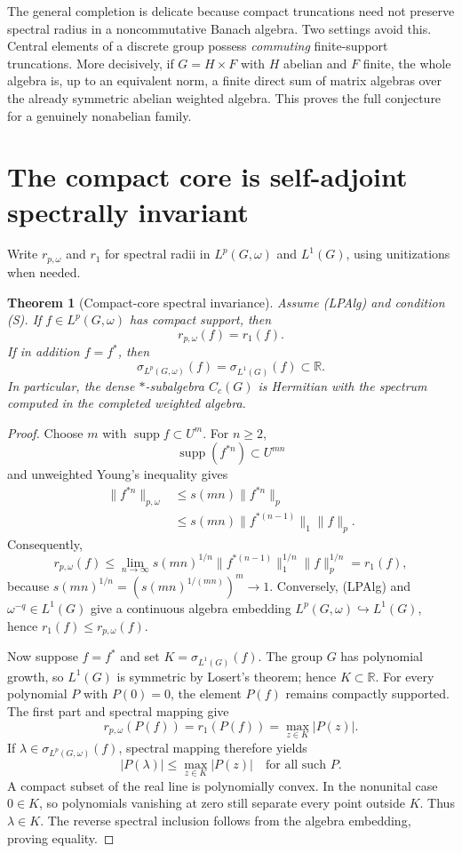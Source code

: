 \documentclass[11pt]{article}
\newtheorem{theorem}{Theorem}
\newcommand{\supp}{\operatorname{supp}}
\newcommand{\spec}{\sigma}
\begin{document}
The general completion is delicate because compact truncations need not
preserve spectral radius in a noncommutative Banach algebra.  Two settings
avoid this.  Central elements of a discrete group possess \emph{commuting}
finite-support truncations.  More decisively, if $G=H\times F$ with $H$
abelian and $F$ finite, the whole algebra is, up to an equivalent norm, a
finite direct sum of matrix algebras over the already symmetric abelian
weighted algebra.  This proves the full conjecture for a genuinely
nonabelian family.

\section{The compact core is self-adjoint spectrally invariant}

Write $r_{p,\omega}$ and $r_1$ for spectral radii in $L^p(G,\omega)$ and
$L^1(G)$, using unitizations when needed.

\begin{theorem}[Compact-core spectral invariance]\label{thm:core}
Assume (LPAlg) and condition (S).  If $f\in L^p(G,\omega)$ has compact
support, then
\[
 r_{p,\omega}(f)=r_1(f).
\]
If in addition $f=f^*$, then
\[
 \spec_{L^p(G,\omega)}(f)=\spec_{L^1(G)}(f)\subset\mathbb R.
\]
In particular, the dense $*$-subalgebra $C_c(G)$ is Hermitian with the
spectrum computed in the completed weighted algebra.
\end{theorem}

\begin{proof}
Choose $m$ with $\supp f\subset U^m$.  For $n\geq2$,
\[
 \supp(f^{*n})\subset U^{mn}
\]
and unweighted Young's inequality gives
\begin{align*}
 \|f^{*n}\|_{p,\omega}
 &\leq s(mn)\|f^{*n}\|_p\\
 &\leq s(mn)\|f^{*(n-1)}\|_1\|f\|_p.
\end{align*}
Consequently,
\[
 r_{p,\omega}(f)
 \leq \lim_{n\to\infty}s(mn)^{1/n}
       \|f^{*(n-1)}\|_1^{1/n}\|f\|_p^{1/n}
 =r_1(f),
\]
because $s(mn)^{1/n}=(s(mn)^{1/(mn)})^m\to1$.  Conversely, (LPAlg) and
$\omega^{-q}\in L^1(G)$ give a continuous algebra embedding
$L^p(G,\omega)\hookrightarrow L^1(G)$, hence $r_1(f)\leq r_{p,\omega}(f)$.

Now suppose $f=f^*$ and set $K=\spec_{L^1(G)}(f)$.  The group $G$ has
polynomial growth, so $L^1(G)$ is symmetric by Losert's theorem; hence
$K\subset\mathbb R$.  For every polynomial $P$ with $P(0)=0$, the element
$P(f)$ remains compactly supported.  The first part and spectral mapping give
\[
 r_{p,\omega}(P(f))=r_1(P(f))=\max_{z\in K}|P(z)|.
\]
If $\lambda\in\spec_{L^p(G,\omega)}(f)$, spectral mapping therefore yields
\[
 |P(\lambda)|\leq\max_{z\in K}|P(z)|
 \quad\text{for all such }P.
\]
A compact subset of the real line is polynomially convex.  In the nonunital
case $0\in K$, so polynomials vanishing at zero still separate every point
outside $K$.  Thus $\lambda\in K$.  The reverse spectral inclusion follows
from the algebra embedding, proving equality.
\end{proof}
\end{document}

